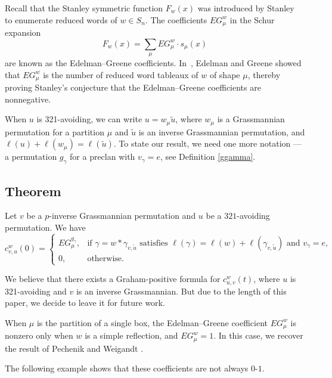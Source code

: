 \documentclass[12pt,reqno]{amsart}
\numberwithin{equation}{section}
\theoremstyle{definition}
\begin{document}
Recall that the Stanley symmetric function $F_{w}(x)$ was introduced by Stanley~\cite{Sta} to enumerate reduced words of $w\in S_n$. The coefficients $EG^{w}_{\mu}$ in the Schur expansion
\[
F_{w}(x)=\sum_{\mu} EG^{w}_{\mu}\cdot s_{\mu}(x)
\]
are known as the Edelman--Greene coefficients. In~\cite{EG}, Edelman and Greene showed that $EG^{w}_{\mu}$ is the number of reduced word tableaux of $w$ of shape $\mu$, thereby proving Stanley's conjecture that the Edelman--Greene coefficients are nonnegative.






When $u$ is 321-avoiding, we can write $u=w_\mu\tilde{u}$, where $w_\mu$ is a Grassmannian permutation for a partition $\mu$ and $\tilde{u}$ is an inverse Grassmannian permutation, and $\ell(u)+\ell(w_\mu)=\ell(\tilde{u})$.  To state our result, we need one more notation --- 
a permutation $g_\gamma$ for a preclan with $v_\gamma=e$, see Definition \ref{ggamma}.

\subsection*{Theorem}
Let $v$ be a $p$-inverse Grassmannian permutation and $u$ be a $321$-avoiding permutation. 
We have 
$$c_{v,u}^w(0)=\begin{cases}
EG^{g_{\gamma}}_{\mu}, & 
\text{if $\gamma=w*\gamma_{v,\tilde{u}}$ 
satisfies $\ell(\gamma)=\ell(w)+\ell(\gamma_{v,\tilde{u}})$ and 
$v_\gamma=e$}, \\[1ex]
0,& \text{otherwise}. 
\end{cases}$$


We believe that there exists a Graham-positive formula for $c_{u,v}^w(t)$, where $u$ is 321-avoiding and $v$ is an inverse Grassmannian.
But due to the length of this paper, we decide to leave it for future work. 

When $\mu$ is the partition of a single box, the Edelman--Greene coefficient $EG^{w}_{\mu}$ is nonzero only when $w$ is a simple reflection, and $EG^{w}_{\mu}=1$. In this case,  we recover the result of Pechenik and Weigandt \cite{Pandt}.

The following example shows that these coefficients are not always $0$-$1$. 
\end{document}
